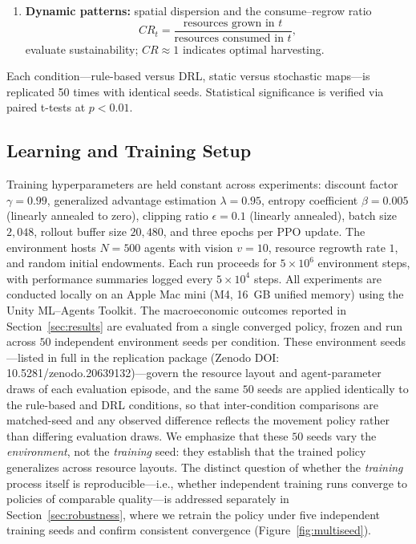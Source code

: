 \documentclass[pdflatex,sn-mathphys-num]{sn-jnl}%
\theoremstyle{thmstyleone}%
\theoremstyle{thmstyletwo}%
\theoremstyle{thmstylethree}%
\begin{document}
\begin{enumerate}
\item \textbf{Dynamic patterns:} spatial dispersion and the consume--regrow ratio
\[
CR_t=\frac{\text{resources grown in }t}{\text{resources consumed in }t},
\]
evaluate sustainability; \(CR\approx1\) indicates optimal harvesting.
\end{enumerate}

Each condition---rule-based versus DRL, static versus stochastic maps---is replicated 50 times with identical seeds.  
Statistical significance is verified via paired t-tests at \(p<0.01\).

\subsection{Learning and Training Setup}
\label{sec:training}
Training hyperparameters are held constant across experiments: discount factor $\gamma = 0.99$, generalized advantage estimation $\lambda = 0.95$, entropy coefficient $\beta = 0.005$ (linearly annealed to zero), clipping ratio $\epsilon = 0.1$ (linearly annealed), batch size $2{,}048$, rollout buffer size $20{,}480$, and three epochs per PPO update.  
The environment hosts $N = 500$ agents with vision $v = 10$, resource regrowth rate $1$, and random initial endowments.  
Each run proceeds for $5\times10^{6}$ environment steps, with performance summaries logged every $5\times10^{4}$ steps.  
All experiments are conducted locally on an Apple Mac mini (M4, 16~GB unified memory) using the Unity ML--Agents Toolkit.
The macroeconomic outcomes reported in Section~\ref{sec:results} are evaluated from a single converged policy, frozen and run across $50$ independent environment seeds per condition.  
These environment seeds---listed in full in the replication package (Zenodo DOI: 10.5281/zenodo.20639132)---govern the resource layout and agent-parameter draws of each evaluation episode, and the same $50$ seeds are applied identically to the rule-based and DRL conditions, so that inter-condition comparisons are matched-seed and any observed difference reflects the movement policy rather than differing evaluation draws.  
We emphasize that these $50$ seeds vary the \emph{environment}, not the \emph{training} seed: they establish that the trained policy generalizes across resource layouts.  
The distinct question of whether the \emph{training} process itself is reproducible---i.e., whether independent training runs converge to policies of comparable quality---is addressed separately in Section~\ref{sec:robustness}, where we retrain the policy under five independent training seeds and confirm consistent convergence (Figure~\ref{fig:multiseed}).
\end{document}
